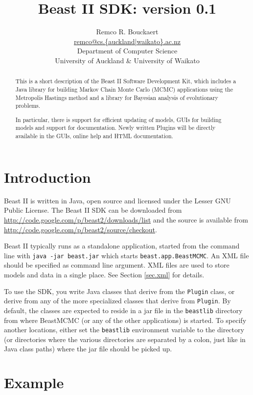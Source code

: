 \documentclass{article}
\title{Beast II SDK: version 0.1}
\author{Remco R. Bouckaert\\\url{remco@cs.{auckland|waikato}.ac.nz}\\
  Department of Computer Science\\
  University of Auckland \& University of Waikato
}
\begin{document}
\maketitle
\begin{abstract}
This is a short description of the Beast II Software Development Kit,
which includes a Java library for building Markov Chain Monte Carlo (MCMC) 
applications using the Metropolis Hastings method and a library for
Bayesian analysis of evolutionary problems.

In particular, there is support for efficient updating of models,
GUIs for building models and support for documentation. Newly written Plugins 
will be directly available in the GUIs, online help and HTML documentation.
\end{abstract}


\section{Introduction}

Beast II is written in Java, open source and licensed under the Lesser GNU Public License.
The Beast II SDK can be downloaded from \url{http://code.google.com/p/beast2/downloads/list}
and the source is available from \url{http://code.google.com/p/beast2/source/checkout}.

Beast II typically runs as a standalone application, started from the command line with
{\tt java -jar beast.jar} which starts {\tt beast.app.BeastMCMC}.
An XML file should be specified as command line argument. XML files are used to
store models and data in a single place. See Section \ref{sec.xml} for details.

To use the SDK, you write Java classes that derive from the {\tt Plugin} class, or derive
from any of the more specialized classes that derive from {\tt Plugin}. By default,
the classes are expected to reside in a jar file in the {\tt beastlib} directory
from where BeastMCMC (or any of the other applications) is started. To specify another
locations, either set the {\tt beastlib} environment variable to the directory (or
directories where the various directories are separated by a colon, just like in Java
class paths) where the jar file should be picked up.


\section{Example\label{sec.example}}
\end{document}
